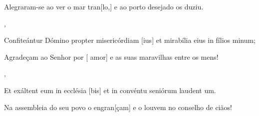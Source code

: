 {        {\item {}Alegraram-se ao ver o mar tran[lo,] e ao porto desejado os duziu.},
    {\item {}Confiteántur Dómino propter misericórdiam [\-ius] et mirabília eius in fílios minum;}%
        {\item {}Agradeçam ao Senhor por [ amor] e as suas maravilhas entre os mens!},
    {\item {}Et exáltent eum in ecclésia [bis] et in convéntu seniórum laudent um.}%
        {\item {}Na assembleia do seu povo o engran[çam] e o louvem no conselho de ciãos!}
}